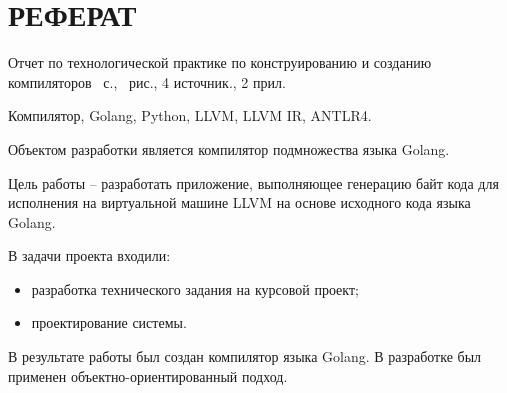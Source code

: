 \section*{РЕФЕРАТ}

Отчет по технологической практике по конструированию и созданию компиляторов~\pageref{LastPage} с.,
\totalfigures\ рис., 4 источник., 2 прил.

Компилятор, Golang, Python, LLVM, LLVM IR, ANTLR4.

Объектом разработки является компилятор подмножества языка Golang.

Цель работы – разработать приложение, выполняющее генерацию байт кода для исполнения на виртуальной машине LLVM
на основе исходного кода языка Golang.

В задачи проекта входили:
\begin{itemize}
    \item разработка технического задания на курсовой проект;
    \item проектирование системы.
\end{itemize}

В результате работы был создан компилятор языка Golang.
В разработке был применен объектно-ориентированный подход.